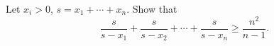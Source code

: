 Let $x_i > 0$, $s = x_1 + \cdots + x_n$. Show that
\[ \frac{s}{s - x_1} + \frac{s}{s - x_2} + \cdots + \frac{s}{s - x_n} \geq \frac{n^2}{n - 1}. \]
